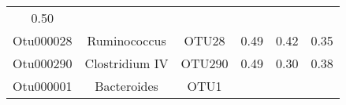 \documentclass[12pt,]{article}
\begin{document}
\begin{longtable}[]{@{}cccccc@{}}
\begin{minipage}[t]{0.04\columnwidth}
0.50\strut
\end{minipage}\tabularnewline
\begin{minipage}[t]{0.08\columnwidth}\centering\strut
Otu000028\strut
\end{minipage} & \begin{minipage}[t]{0.17\columnwidth}\centering\strut
Ruminococcus\strut
\end{minipage} & \begin{minipage}[t]{0.15\columnwidth}\centering\strut
OTU28\strut
\end{minipage} & \begin{minipage}[t]{0.22\columnwidth}\centering\strut
0.49\strut
\end{minipage} & \begin{minipage}[t]{0.17\columnwidth}\centering\strut
0.42\strut
\end{minipage} & \begin{minipage}[t]{0.04\columnwidth}\centering\strut
0.35\strut
\end{minipage}\tabularnewline
\begin{minipage}[t]{0.08\columnwidth}\centering\strut
Otu000290\strut
\end{minipage} & \begin{minipage}[t]{0.17\columnwidth}\centering\strut
Clostridium IV\strut
\end{minipage} & \begin{minipage}[t]{0.15\columnwidth}\centering\strut
OTU290\strut
\end{minipage} & \begin{minipage}[t]{0.22\columnwidth}\centering\strut
0.49\strut
\end{minipage} & \begin{minipage}[t]{0.17\columnwidth}\centering\strut
0.30\strut
\end{minipage} & \begin{minipage}[t]{0.04\columnwidth}\centering\strut
0.38\strut
\end{minipage}\tabularnewline
\begin{minipage}[t]{0.08\columnwidth}\centering\strut
Otu000001\strut
\end{minipage} & \begin{minipage}[t]{0.17\columnwidth}\centering\strut
Bacteroides\strut
\end{minipage} & \begin{minipage}[t]{0.15\columnwidth}\centering\strut
OTU1\strut
\end{minipage} & \begin{minipage}[t]{0.22\columnwidth}\centering\strut

\end{minipage}
\end{longtable}
\end{document}
